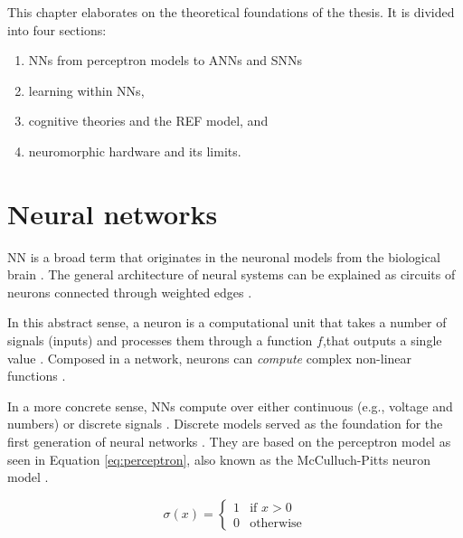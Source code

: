\documentclass[report.tex]{subfiles}
\begin{document}
This chapter elaborates on the theoretical foundations of the thesis.
It is divided into four sections: 

\begin{enumerate}
  \item \glspl{NN} from perceptron models to \glspl{ANN} and \glspl{SNN}
  \item learning within \glspl{NN}, 
  \item cognitive theories and the \gls{REF} model, and
  \item neuromorphic hardware and its limits.
\end{enumerate}

\section{Neural networks} \label{sec:nn}
\gls{NN} is a broad term that originates in the neuronal models from
the biological brain \cite{Dayan2001}.
The general architecture of neural systems can be explained as circuits
of neurons  connected through weighted edges
\cite{Russel2007, Dayan2001}.

In this abstract sense, a neuron is a computational unit that
takes a number of signals (inputs) and processes them through a
function $f$,that outputs a single value \cite{Eliasmith2004}.
Composed in a network, neurons can \textit{compute} 
complex non-linear functions \cite{Eliasmith2004, Dayan2001}.

In a more concrete sense, \glspl{NN} compute over either
continuous (e.g., voltage and numbers) or discrete signals
\cite{Russel2007, Schmidhuber2014}.
Discrete models served as the foundation for
the first generation of neural networks \cite{Russel2007, Maass1997}.
They are based on the perceptron model as seen in Equation
\ref{eq:perceptron}, also known as the McCulluch-Pitts neuron model
\cite{Eliasmith2004}.

\begin{equation} \label{eq:perceptron}
\sigma(x) = \begin{cases}
	 1 & \text{if } x > 0\\
	 0 & \text{otherwise}
       \end{cases}
\end{equation}
\end{document}
